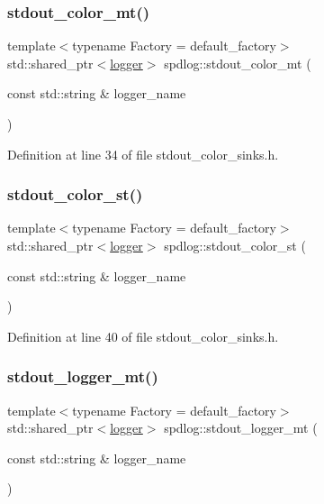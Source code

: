 \subsubsection{\texorpdfstring{stdout\+\_\+color\+\_\+mt()}{stdout\_color\_mt()}}
{\footnotesize\ttfamily template$<$typename Factory  = default\+\_\+factory$>$ \\
std\+::shared\+\_\+ptr$<$\hyperlink{classspdlog_1_1logger}{logger}$>$ spdlog\+::stdout\+\_\+color\+\_\+mt (\begin{DoxyParamCaption}\item[{const std\+::string \&}]{logger\+\_\+name }\end{DoxyParamCaption})\hspace{0.3cm}{\ttfamily [inline]}}



Definition at line 34 of file stdout\+\_\+color\+\_\+sinks.\+h.

\mbox{\label{namespacespdlog_a1d20b70d425e5402b3fa6a1b075d1c6d}} 
\subsubsection{\texorpdfstring{stdout\+\_\+color\+\_\+st()}{stdout\_color\_st()}}
{\footnotesize\ttfamily template$<$typename Factory  = default\+\_\+factory$>$ \\
std\+::shared\+\_\+ptr$<$\hyperlink{classspdlog_1_1logger}{logger}$>$ spdlog\+::stdout\+\_\+color\+\_\+st (\begin{DoxyParamCaption}\item[{const std\+::string \&}]{logger\+\_\+name }\end{DoxyParamCaption})\hspace{0.3cm}{\ttfamily [inline]}}



Definition at line 40 of file stdout\+\_\+color\+\_\+sinks.\+h.

\mbox{\label{namespacespdlog_a9a6a99d3309b166a585fe918bd83a442}} 
\subsubsection{\texorpdfstring{stdout\+\_\+logger\+\_\+mt()}{stdout\_logger\_mt()}}
{\footnotesize\ttfamily template$<$typename Factory  = default\+\_\+factory$>$ \\
std\+::shared\+\_\+ptr$<$\hyperlink{classspdlog_1_1logger}{logger}$>$ spdlog\+::stdout\+\_\+logger\+\_\+mt (\begin{DoxyParamCaption}\item[{const std\+::string \&}]{logger\+\_\+name }\end{DoxyParamCaption})\hspace{0.3cm}{\ttfamily [inline]}}



